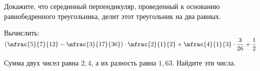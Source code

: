 \begin{class}[number=5]
\begin{listofex}[resume]
\begin{minipage}[c]{0.34\linewidth}
		\end{minipage}
		\item Докажите, что серединный перпендикуляр, проведенный к основанию равнобедренного треугольника, делит этот треугольник на два равных.
		\item Вычислить: \( \left( \mfrac{5}{7}{12}-\mfrac{3}{17}{36} \right)\cdot\mfrac{2}{1}{2}+\mfrac{4}{1}{3}\cdot\dfrac{3}{26}+\dfrac{1}{2} \)
		\item Сумма двух чисел равна \(2,4\), а их разность равна \(1,63\). Найдите эти числа.
	\end{listofex}
\end{class}
%
%
%
%	
%
%
